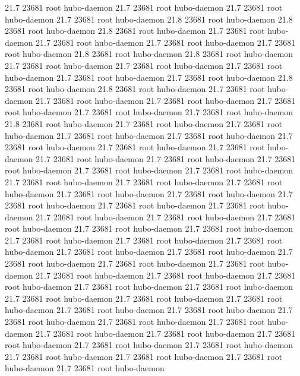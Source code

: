 21.7 23681 root     hubo-daemon
21.7 23681 root     hubo-daemon
21.7 23681 root     hubo-daemon
21.7 23681 root     hubo-daemon
21.8 23681 root     hubo-daemon
21.8 23681 root     hubo-daemon
21.8 23681 root     hubo-daemon
21.7 23681 root     hubo-daemon
21.7 23681 root     hubo-daemon
21.7 23681 root     hubo-daemon
21.7 23681 root     hubo-daemon
21.8 23681 root     hubo-daemon
21.8 23681 root     hubo-daemon
21.7 23681 root     hubo-daemon
21.7 23681 root     hubo-daemon
21.7 23681 root     hubo-daemon
21.7 23681 root     hubo-daemon
21.7 23681 root     hubo-daemon
21.8 23681 root     hubo-daemon
21.8 23681 root     hubo-daemon
21.7 23681 root     hubo-daemon
21.7 23681 root     hubo-daemon
21.7 23681 root     hubo-daemon
21.7 23681 root     hubo-daemon
21.7 23681 root     hubo-daemon
21.7 23681 root     hubo-daemon
21.8 23681 root     hubo-daemon
21.7 23681 root     hubo-daemon
21.7 23681 root     hubo-daemon
21.7 23681 root     hubo-daemon
21.7 23681 root     hubo-daemon
21.7 23681 root     hubo-daemon
21.7 23681 root     hubo-daemon
21.7 23681 root     hubo-daemon
21.7 23681 root     hubo-daemon
21.7 23681 root     hubo-daemon
21.7 23681 root     hubo-daemon
21.7 23681 root     hubo-daemon
21.7 23681 root     hubo-daemon
21.7 23681 root     hubo-daemon
21.7 23681 root     hubo-daemon
21.7 23681 root     hubo-daemon
21.7 23681 root     hubo-daemon
21.7 23681 root     hubo-daemon
21.7 23681 root     hubo-daemon
21.7 23681 root     hubo-daemon
21.7 23681 root     hubo-daemon
21.7 23681 root     hubo-daemon
21.7 23681 root     hubo-daemon
21.7 23681 root     hubo-daemon
21.7 23681 root     hubo-daemon
21.7 23681 root     hubo-daemon
21.7 23681 root     hubo-daemon
21.7 23681 root     hubo-daemon
21.7 23681 root     hubo-daemon
21.7 23681 root     hubo-daemon
21.7 23681 root     hubo-daemon
21.7 23681 root     hubo-daemon
21.7 23681 root     hubo-daemon
21.7 23681 root     hubo-daemon
21.7 23681 root     hubo-daemon
21.7 23681 root     hubo-daemon
21.7 23681 root     hubo-daemon
21.7 23681 root     hubo-daemon
21.7 23681 root     hubo-daemon
21.7 23681 root     hubo-daemon
21.7 23681 root     hubo-daemon
21.7 23681 root     hubo-daemon
21.7 23681 root     hubo-daemon
21.7 23681 root     hubo-daemon
21.7 23681 root     hubo-daemon
21.7 23681 root     hubo-daemon
21.7 23681 root     hubo-daemon
21.7 23681 root     hubo-daemon
21.7 23681 root     hubo-daemon
21.7 23681 root     hubo-daemon
21.7 23681 root     hubo-daemon
21.7 23681 root     hubo-daemon
21.7 23681 root     hubo-daemon
21.7 23681 root     hubo-daemon
21.7 23681 root     hubo-daemon
21.7 23681 root     hubo-daemon
